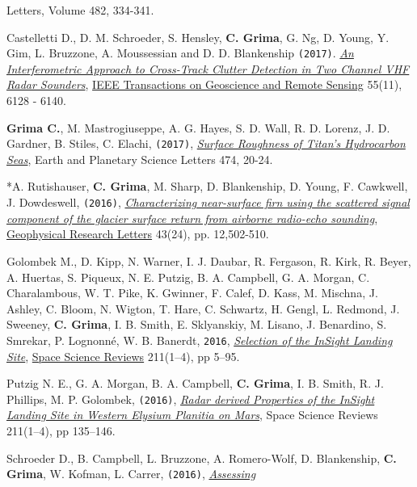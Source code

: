 \begin{etaremune}
{  Letters}, Volume 482, 334-341.
\item
  Castelletti D., D. M. Schroeder, S. Hensley, \textbf{C. Grima}, G. Ng,
  D. Young, Y. Gim, L. Bruzzone, A. Moussessian and D. D. Blankenship
  \texttt{(2017)}.
  \href{http://ieeexplore.ieee.org/abstract/document/8012547/}{\emph{An
  Interferometric Approach to Cross-Track Clutter Detection in Two
  Channel VHF Radar Sounders}}, \ul{IEEE Transactions on Geoscience and
  Remote Sensing} 55(11), 6128 - 6140.
\item
  \textbf{Grima C.}, M. Mastrogiuseppe, A. G. Hayes, S. D. Wall, R. D.
  Lorenz, J. D. Gardner, B. Stiles, C. Elachi, \texttt{(2017)},
  \href{http://www.sciencedirect.com/science/article/pii/S0012821X17303163}{\emph{Surface
  Roughness of Titan's Hydrocarbon Seas}}, Earth and Planetary Science
  Letters 474, 20-24.
\item
  *A. Rutishauser, \textbf{C. Grima}, M. Sharp, D.
  Blankenship, D. Young, F. Cawkwell, J. Dowdeswell, \texttt{(2016)},
  \href{http://onlinelibrary.wiley.com/doi/10.1002/2016GL071230/full}{\emph{Characterizing
  near-surface firn using the scattered signal component of the glacier
  surface return from airborne radio-echo sounding}}, \ul{Geophysical
  Research Letters} 43(24), pp. 12,502-510.
\item
  Golombek M., D. Kipp, N. Warner, I. J. Daubar, R. Fergason, R. Kirk,
  R. Beyer, A. Huertas, S. Piqueux, N. E. Putzig, B. A. Campbell, G. A.
  Morgan, C. Charalambous, W. T. Pike, K. Gwinner, F. Calef, D. Kass, M.
  Mischna, J. Ashley, C. Bloom, N. Wigton, T. Hare, C. Schwartz, H.
  Gengl, L. Redmond, J. Sweeney, \textbf{C. Grima}, I. B. Smith, E.
  Sklyanskiy, M. Lisano, J. Benardino, S. Smrekar, P. Lognonné, W. B.
  Banerdt, \texttt{2016},
  \href{http://link.springer.com/article/10.1007/s11214-016-0321-9?wt_mc=Internal.Event.1.SEM.ArticleAuthorOnlineFirst}{\emph{Selection
  of the InSight Landing Site}}, \ul{Space Science Reviews} 211(1–4), pp 5–95.
\item
  Putzig N. E., G. A. Morgan, B. A. Campbell, \textbf{C. Grima}, I. B.
  Smith, R. J. Phillips, M. P. Golombek, \texttt{(2016)},
  \href{http://link.springer.com/article/10.1007\%2Fs11214-016-0322-8}{\emph{Radar
  derived Properties of the InSight Landing Site in Western Elysium
  Planitia on Mars}}, Space Science Reviews 211(1–4), pp 135–146.
\item
  Schroeder D., B. Campbell, L. Bruzzone, A. Romero-Wolf, D.
  Blankenship, \textbf{C. Grima}, W. Kofman, L. Carrer, \texttt{(2016)},
  \href{http://www.sciencedirect.com/science/article/pii/S0032063316301465}{\emph{Assessing
}}
\end{etaremune}
